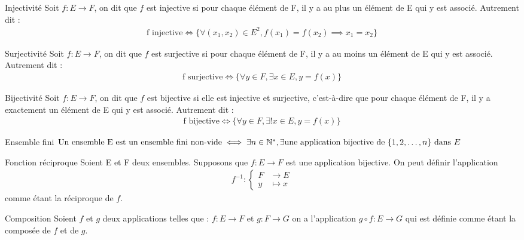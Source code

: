 \begin{definition}{Injectivité}
	Soit $f:E \to F$, on dit que $f$ est injective si pour chaque élément de F, il y a au plus un élément de E qui y est associé. Autrement dit :
	\begin{align*}
		\text{f injective} \iff \{\forall (x_1, x_2) \in E^2, f(x_1) = f(x_2) \implies x_1 = x_2\}
	\end{align*}
\end{definition}

\begin{definition}{Surjectivité}
	Soit $f:E \to F$, on dit que $f$ est surjective si pour chaque élément de F, il y a au moins un élément de E qui y est associé.
	Autrement dit :
	\begin{align*}
		\text{f surjective} \iff \{\forall y \in F, \exists x \in E, y = f(x)\}
	\end{align*}
\end{definition}

\begin{definition}{Bijectivité}
	Soit $f:E \to F$, on dit que $f$ est bijective si elle est injective et surjective, c'est-à-dire que pour chaque élément de F, il y a exactement un élément de E qui y est associé.
	Autrement dit :
	\begin{align*}
		\text{f bijective} \iff \{\forall y \in F, \exists! x \in E, y = f(x)\}
	\end{align*}
\end{definition}

\begin{definition}{Ensemble fini}
	$
		\text{Un ensemble E est un ensemble fini non-vide} \iff \exists n \in \mathbb{N}^*, \exists \text{une application bijective de } \{1,2,\ldots,n\} \text{ dans } E
	$
\end{definition}

\begin{definition}{Fonction réciproque}
	Soient E et F deux ensembles. Supposons que $f:E \to F$ est une application bijective. On peut définir l'application 
	\begin{align*}
		f^{-1} : 
		\begin{cases}
			F &\to E \\
			y &\mapsto x
		\end{cases}
	\end{align*}
	comme étant la réciproque de $f$.
\end{definition}

\begin{definition}{Composition}
	Soient $f$ et $g$ deux applications telles que :
	$f:E \to F$ et $g:F \to G$ on a l'application $g \circ f : E \to G$ qui est définie comme étant la composée de $f$ et de $g$.
\end{definition}

